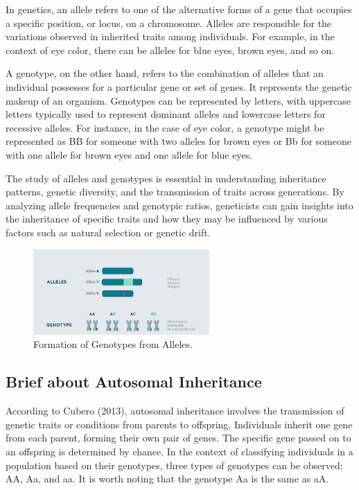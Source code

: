 \documentclass[a4paper,12pt]{article}
\begin{document}
In genetics, an allele refers to one of the alternative forms of a gene that occupies a specific position, or locus, on a chromosome. Alleles are responsible for the variations observed in inherited traits among individuals. For example, in the context of eye color, there can be alleles for blue eyes, brown eyes, and so on.

A genotype, on the other hand, refers to the combination of alleles that an individual possesses for a particular gene or set of genes. It represents the genetic makeup of an organism. Genotypes can be represented by letters, with uppercase letters typically used to represent dominant alleles and lowercase letters for recessive alleles. For instance, in the case of eye color, a genotype might be represented as BB for someone with two alleles for brown eyes or Bb for someone with one allele for brown eyes and one allele for blue eyes.

The study of alleles and genotypes is essential in understanding inheritance patterns, genetic diversity, and the transmission of traits across generations. By analyzing allele frequencies and genotypic ratios, geneticists can gain insights into the inheritance of specific traits and how they may be influenced by various factors such as natural selection or genetic drift. \ \\
\begin{figure}[h]
\centering
\includegraphics[width=0.6\textwidth]{Alleles.png}
\caption{Formation of Genotypes from Alleles.}
\label{fig:Punett-table}
\end{figure}
\subsection{Brief about Autosomal Inheritance}
According to Cubero (2013), autosomal inheritance involves the transmission of genetic traits or conditions from parents to offspring. Individuals inherit one gene from each parent, forming their own pair of genes. The specific gene passed on to an offspring is determined by chance. In the context of classifying individuals in a population based on their genotypes, three types of genotypes can be observed: AA, Aa, and aa. It is worth noting that the genotype Aa is the same as aA.
\end{document}
